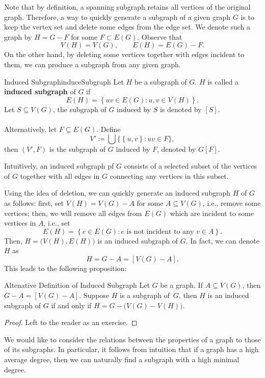 \documentclass[math]{amznotes}
\theoremstyle{remark}
\begin{document}
Note that by definition, a spanning subgraph retains all vertices of the original graph. Therefore, a way to quickly generate a subgraph of a given graph $G$ is to keep the vertex set and delete some edges from the edge set. We denote such a graph by $H = G - F$ for some $F \subset E(G)$. Observe that 
\begin{equation*}
    V(H) = V(G), \qquad E(H) = E(G) - F.
\end{equation*}
On the other hand, by deleting some vertices together with edges incident to them, we can produce a subgraph from any given graph.
\begin{dfnbox}{Induced Subgraph}{induceSubgraph}
    Let $H$ be a subgraph of $G$. $H$ is called a {\color{red} \textbf{induced subgraph}} of $G$ if
    \begin{equation*}
        E(H) = \left\{uv \in E(G) \colon u, v \in V(H)\right\}.
    \end{equation*}
    Let $S \subseteq V(G)$, the subgraph of $G$ induced by $S$ is denoted by $[S]$.
    \\\\
    Alternatively, let $F \subseteq E(G)$. Define
    \begin{equation*}
        V' \coloneqq \bigcup \bigl\{\left\{u, v\right\} \colon uv \in F\bigr\},
    \end{equation*}
    then $(V', F)$ is the subgraph of $G$ induced by $F$, denoted by $G[F]$.
\end{dfnbox}
Intuitively, an induced subgraph pf $G$ consists of a selected subset of the vertices of $G$ together with all edges in $G$ connecting any vertices in this subset.

Using the idea of deletion, we can quickly generate an induced subgraph $H$ of $G$ as follows: first, set $V(H) = V(G) - A$ for some $A \subseteq V(G)$, i.e., remove some vertices; then, we will remove all edges from $E(G)$ which are incident to some vertices in $A$, i.e., set
\begin{equation*}
    E(H) = \left\{e \in E(G) \colon e \textrm{ is not incident to any } v \in A\right\}.
\end{equation*}
Then, $H = \bigl(V(H), E(H)\bigr)$ is an induced subgraph of $G$. In fact, we can denote $H$ as
\begin{equation*}
    H = G - A = [V(G) - A].
\end{equation*}
This leads to the following proposition:
\begin{probox}{Altenative Definition of Induced Subgraph}{}
    Let $G$ be a graph. If $A \subseteq V(G)$, then $G - A = [V(G) - A]$. Suppose $H$ is a subgraph of~$G$, then $H$ is an induced subgraph of $G$ if and only if $H = G - \bigl(V(G) - V(H)\bigr)$.
    \tcblower
    \begin{proof}
        Left to the reader as an exercise.
    \end{proof}
\end{probox}
We would like to consider the relations between the properties of a graph to those of its subgraphs. In particular, it follows from intuition that if a graph has a high average degree, then we can naturally find a subgraph with a high minimal degree.
\end{document}
